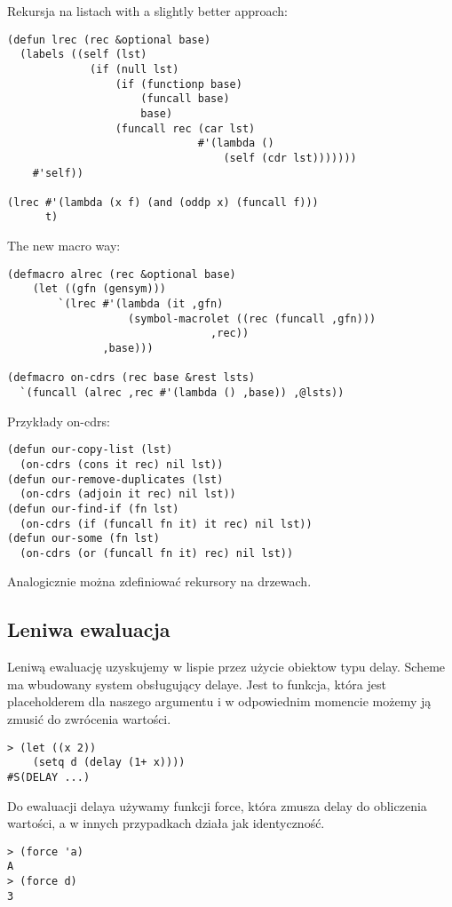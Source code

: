 \begin{frame}[fragile]{}
Rekursja na listach with a slightly better approach:
\begin{verbatim}
(defun lrec (rec &optional base)
  (labels ((self (lst)
             (if (null lst)
                 (if (functionp base)
                     (funcall base)
                     base)
                 (funcall rec (car lst)
                              #'(lambda ()
                                  (self (cdr lst)))))))
    #'self))

(lrec #'(lambda (x f) (and (oddp x) (funcall f)))
      t)
\end{verbatim}
\end{frame}

\begin{frame}[fragile]{}
The new macro way:
\begin{verbatim}
(defmacro alrec (rec &optional base)
    (let ((gfn (gensym)))
        `(lrec #'(lambda (it ,gfn)
	               (symbol-macrolet ((rec (funcall ,gfn)))
		                        ,rec))
	           ,base)))

(defmacro on-cdrs (rec base &rest lsts)
  `(funcall (alrec ,rec #'(lambda () ,base)) ,@lsts))
\end{verbatim}
\end{frame}

\begin{frame}[fragile]{}
Przykłady on-cdrs:
\begin{verbatim}
(defun our-copy-list (lst)
  (on-cdrs (cons it rec) nil lst))
(defun our-remove-duplicates (lst)
  (on-cdrs (adjoin it rec) nil lst))
(defun our-find-if (fn lst)
  (on-cdrs (if (funcall fn it) it rec) nil lst))
(defun our-some (fn lst)
  (on-cdrs (or (funcall fn it) rec) nil lst))
\end{verbatim}
Analogicznie można zdefiniować rekursory na drzewach.
\end{frame}

\subsection{Leniwa ewaluacja}
\begin{frame}[fragile]{}
Leniwą ewaluację uzyskujemy w lispie przez użycie obiektow typu delay. Scheme ma wbudowany system obsługujący delaye.
Jest to funkcja, która jest placeholderem dla naszego argumentu i w odpowiednim momencie możemy ją zmusić do zwrócenia 
wartości.
\begin{verbatim}
> (let ((x 2))
    (setq d (delay (1+ x))))
#S(DELAY ...)
\end{verbatim}
\pause
Do ewaluacji delaya używamy funkcji force, która zmusza delay do obliczenia wartości, a w innych przypadkach działa jak identyczność.
\begin{verbatim}
> (force 'a)
A
> (force d)
3
\end{verbatim}
\end{frame}


